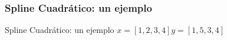 \documentclass[xcolor=svgnames]{beamer} %
\theoremstyle{plain}
\theoremstyle{definition}
\begin{document}
\subsubsection{Spline Cuadrático: un ejemplo}

\begin{frame}{Spline Cuadrático: un ejemplo}
   $x= [1, 2, 3, 4]$\hspace{10pt}$y=[1, 5, 3, 4]$ 
  
  \begin{minipage}{.5\linewidth}

\end{minipage}
\end{frame}
\end{document}

